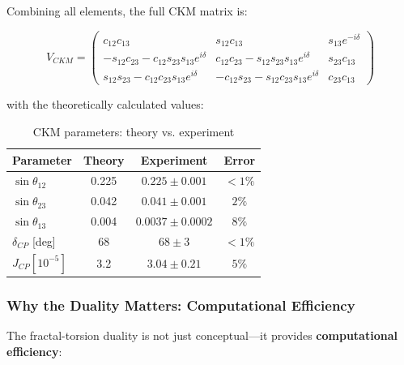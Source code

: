 Combining all elements, the full CKM matrix is:

\begin{equation}
    V_{CKM} = 
    \begin{pmatrix}
        c_{12}c_{13} & s_{12}c_{13} & s_{13}e^{-i\delta} \\
        -s_{12}c_{23} - c_{12}s_{23}s_{13}e^{i\delta} & c_{12}c_{23} - s_{12}s_{23}s_{13}e^{i\delta} & s_{23}c_{13} \\
        s_{12}s_{23} - c_{12}c_{23}s_{13}e^{i\delta} & -c_{12}s_{23} - s_{12}c_{23}s_{13}e^{i\delta} & c_{23}c_{13}
    \end{pmatrix}
\end{equation}

with the theoretically calculated values:

\begin{table}[h]
\centering
\begin{tabular}{lccc}
\hline
\textbf{Parameter} & \textbf{Theory} & \textbf{Experiment} & \textbf{Error} \\
\hline
$\sin\theta_{12}$ & 0.225 & $0.225 \pm 0.001$ & $<1\%$ \\
$\sin\theta_{23}$ & 0.042 & $0.041 \pm 0.001$ & $2\%$ \\
$\sin\theta_{13}$ & 0.004 & $0.0037 \pm 0.0002$ & $8\%$ \\
$\delta_{CP}$ [deg] & 68 & $68 \pm 3$ & $<1\%$ \\
$J_{CP} [10^{-5}]$ & 3.2 & $3.04 \pm 0.21$ & $5\%$ \\
\hline
\end{tabular}
\caption{CKM parameters: theory vs. experiment}
\end{table}

\subsubsection{Why the Duality Matters: Computational Efficiency}

The fractal-torsion duality is not just conceptual—it provides \textbf{computational efficiency}:

